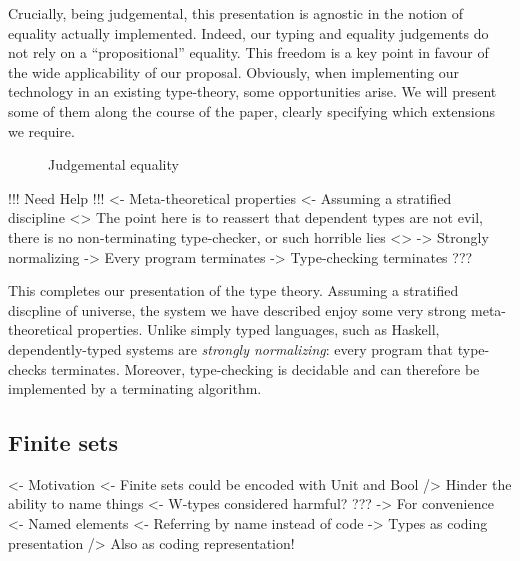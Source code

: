 Crucially, being judgemental, this presentation is agnostic in the
notion of equality actually implemented. Indeed, our typing and
equality judgements do not rely on a ``propositional'' equality. This
freedom is a key point in favour of the wide applicability of our
proposal. Obviously, when implementing our technology in an existing
type-theory, some opportunities arise. We will present some of them
along the course of the paper, clearly specifying which extensions we
require.

\begin{figure}



\caption{Judgemental equality}
\label{fig:judgemental-equality}

\end{figure}



\begin{wstructure}
!!! Need Help !!!
<- Meta-theoretical properties
    <- Assuming a stratified discipline
    <> The point here is to reassert that dependent types are not evil, 
       there is no non-terminating type-checker, or such horrible lies <>
    -> Strongly normalizing
        -> Every program terminates
    -> Type-checking terminates
    ???
\end{wstructure}

This completes our presentation of the type theory. Assuming a
stratified discpline of universe, the system we have described enjoy
some very strong meta-theoretical properties. Unlike simply typed
languages, such as Haskell, dependently-typed systems are
\emph{strongly normalizing}: every program that type-checks
terminates. Moreover, type-checking is decidable and can therefore be
implemented by a terminating algorithm.


\subsection{Finite sets}

\begin{wstructure}
<- Motivation
    <- Finite sets could be encoded with Unit and Bool
        /> Hinder the ability to name things
    <- W-types considered harmful?
        ???
    -> For convenience
        <- Named elements
        <- Referring by name instead of code
        -> Types as coding presentation
            /> Also as coding representation!
\end{wstructure}

